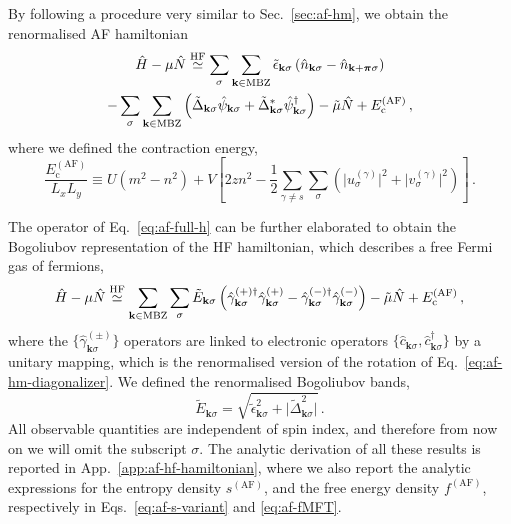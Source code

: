 By following a procedure very similar to Sec.~\ref{sec:af-hm}, we obtain the renormalised AF hamiltonian
\begin{multline}
	\hat H - \mu \hat N \stackrel{\mathrm{HF}}{\simeq} \sum_\sigma \sum_{\mathbf{k}\in\mathrm{MBZ}} \tilde{\epsilon}_{\mathbf{k}\sigma} \left(
	\hat n_{\mathbf{k}\sigma} - \hat n_{\mathbf{k}+\bm{\pi}\sigma}
	\right) \\
	- \sum_\sigma \sum_{\mathbf{k}\in\mathrm{MBZ}} \left(
	\tilde{\Delta}_{\mathbf{k}\sigma}
	\hat \psi_{\mathbf{k}\sigma} + \tilde{\Delta}_{\mathbf{k}\sigma}^* \hat \psi_{\mathbf{k}\sigma}^\dagger
	\right)
	- \tilde{\mu} \hat N + E_\mathrm{c}^{(\mathrm{AF})} \, , \label{eq:af-full-h}
\end{multline}
where we defined the contraction energy,
\begin{equation}\label{eq:af-Ec}
	\frac{E_\mathrm{c}^{(\mathrm{AF})}}{L_x L_y} \equiv U(m^2 - n^2) + V \left[
	2zn^2 - \frac{1}{2} \sum_{\gamma \neq s} \sum_\sigma \left(
	\big|u^{(\gamma)}_\sigma\big|^2 + \big|v^{(\gamma)}_\sigma\big|^2
	\right)
	\right] \, .
\end{equation}

The operator of Eq.~\eqref{eq:af-full-h} can be further elaborated to obtain the Bogoliubov representation of the HF hamiltonian, which describes a free Fermi gas of fermions,
\begin{equation}\label{eq:af-ehm-bog}
	\hat H - \mu \hat N \stackrel{\mathrm{HF}}{\simeq} \sum_{\mathbf{k} \in \mathrm{MBZ}} \sum_\sigma \tilde{E}_{\mathbf{k}\sigma} \left(
	\hat \gamma_{\mathbf{k}\sigma}^{(+)\dagger} \hat \gamma_{\mathbf{k}\sigma}^{(+)} - \hat \gamma_{\mathbf{k}\sigma}^{(-)\dagger} \hat \gamma_{\mathbf{k}\sigma}^{(-)}
	\right) - \tilde{\mu} \hat N + E_\mathrm{c}^{(\mathrm{AF})} \, ,
\end{equation}
where the $\lbrace \hat \gamma_{\mathbf{k}\sigma}^{(\pm)} \rbrace$ operators are linked to electronic operators $\lbrace \hat c_{\mathbf{k}\sigma}, \hat c_{\mathbf{k}\sigma}^\dagger \rbrace$ by a unitary mapping, which is the renormalised version of the rotation of Eq.~\eqref{eq:af-hm-diagonalizer}. We defined the renormalised Bogoliubov bands,
\begin{equation}\label{eq:af-bands-2}
	\tilde{E}_{\mathbf{k}\sigma} = \sqrt{
		\tilde{\epsilon}_{\mathbf{k}\sigma}^2 + \big| \tilde{\Delta}_{\mathbf{k}\sigma}^2 \big|
	} \, .
\end{equation}
All observable quantities are independent of spin index, and therefore from now on we will omit the subscript $\sigma$. The analytic derivation of all these results is reported in App.~\ref{app:af-hf-hamiltonian}, where we also report the analytic expressions for the entropy density $s^{(\mathrm{AF})}$, and the free energy density $f^{(\mathrm{AF})}$, respectively in Eqs.~\eqref{eq:af-s-variant} and \eqref{eq:af-fMFT}.

